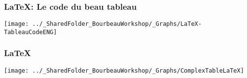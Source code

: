 \documentclass{beamer}
\begin{document}
    \begin{frame}
        \frametitle{\LaTeX: Le code du beau tableau} \vspace{1cm}   
        \begin{center}
           \texttt{[image: ../\_SharedFolder\_BourbeauWorkshop/\_Graphs/LaTeX-TableauCodeENG]}
        \end{center}  
    \end{frame}
    
    \begin{frame}
        \frametitle{\LaTeX} \vspace{1cm}   
        \begin{center}
           \texttt{[image: ../\_SharedFolder\_BourbeauWorkshop/\_Graphs/ComplexTableLaTeX]}
        \end{center}  
    \end{frame}
    
\end{document}
